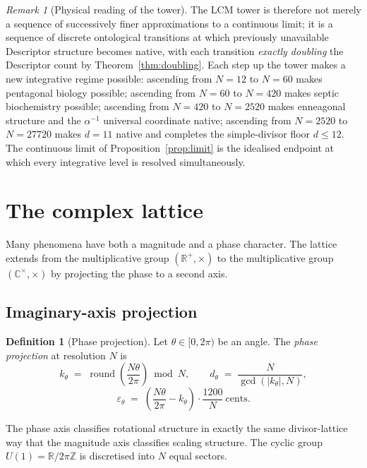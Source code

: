 \documentclass[11pt,a4paper]{article}
\theoremstyle{definition}
\newtheorem{definition}[theorem]{Definition}
\theoremstyle{remark}
\newtheorem{remark}[theorem]{Remark}
\newcommand{\R}{\mathbb{R}}
\newcommand{\Z}{\mathbb{Z}}
\newcommand{\C}{\mathbb{C}}
\DeclareMathOperator{\round}{round}
\newcommand{\eps}{\varepsilon}
\begin{document}
\begin{remark}[Physical reading of the tower]
The LCM tower is therefore not merely a sequence of successively finer approximations to a continuous limit; it is a sequence of discrete ontological transitions at which previously unavailable Descriptor structure becomes native, with each transition \emph{exactly doubling} the Descriptor count by Theorem~\ref{thm:doubling}. Each step up the tower makes a new integrative regime possible: ascending from $N=12$ to $N=60$ makes pentagonal biology possible; ascending from $N=60$ to $N=420$ makes septic biochemistry possible; ascending from $N=420$ to $N=2520$ makes enneagonal structure and the $\alpha^{-1}$ universal coordinate native; ascending from $N=2520$ to $N=27720$ makes $d=11$ native and completes the simple-divisor floor $d\le 12$. The continuous limit of Proposition~\ref{prop:limit} is the idealised endpoint at which every integrative level is resolved simultaneously.
\end{remark}

\section{The complex lattice}\label{sec:complex}

Many phenomena have both a magnitude and a phase character. The lattice extends from the multiplicative group $(\R^{+},\times)$ to the multiplicative group $(\C^{\times},\times)$ by projecting the phase to a second axis.

\subsection{Imaginary-axis projection}

\begin{definition}[Phase projection]\label{def:phase}
Let $\theta\in[0,2\pi)$ be an angle. The \emph{phase projection} at resolution $N$ is
\[
k_{\theta} \;=\; \round\!\left(\frac{N\theta}{2\pi}\right)\bmod N, \qquad d_{\theta} \;=\; \frac{N}{\gcd(|k_{\theta}|,N)},
\]
\[
\eps_{\theta} \;=\; \left(\frac{N\theta}{2\pi}-k_{\theta}\right)\cdot\frac{1200}{N}\ \text{cents}.
\]
\end{definition}

The phase axis classifies rotational structure in exactly the same divisor-lattice way that the magnitude axis classifies scaling structure. The cyclic group $U(1) = \R/2\pi\Z$ is discretised into $N$ equal sectors.
\end{document}
